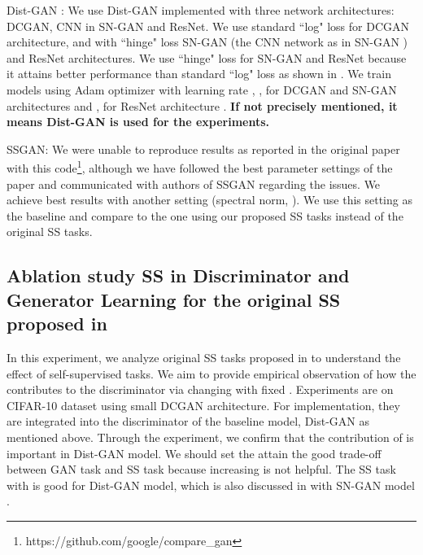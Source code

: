 \documentclass{article}
\begin{document}
Dist-GAN \cite{tran-eccv-2018}: We use Dist-GAN implemented with three network architectures: DCGAN, CNN in SN-GAN and ResNet.
We use standard ``log" loss for DCGAN architecture, and  with ``hinge" loss SN-GAN (the CNN network as in SN-GAN \cite{miyato-iclr-2018}) and ResNet architectures. We use ``hinge" loss for SN-GAN  and ResNet because it attains better performance than standard ``log" loss as shown in \cite{miyato-iclr-2018}. 
We train models using Adam optimizer with learning rate , ,  for DCGAN and SN-GAN architectures and ,  for ResNet architecture \cite{gulrajani-arxiv-2017}. {\bf If not precisely mentioned, it means Dist-GAN is used for the experiments.}

SSGAN: We were unable to reproduce results as reported in the original paper with this code\footnote{https://github.com/google/compare\_gan}, although we have followed the best parameter settings of the paper and communicated with authors of SSGAN regarding the issues. We achieve best results with another setting (spectral norm, ).
We use this setting as the baseline and compare to the one using our proposed SS tasks instead of the original SS tasks.


\subsection{Ablation study SS in Discriminator and Generator Learning for the original SS proposed in 
\cite{chen-arxiv-2018}}



\label{appendix_ablation_discriminator_learning}

In this experiment, we analyze original SS tasks proposed in \cite{chen-arxiv-2018} to understand the effect of self-supervised tasks.
We aim to provide empirical observation of how the  contributes to the discriminator via changing  with fixed . Experiments are on CIFAR-10 dataset using small DCGAN architecture. For implementation, they are integrated into the discriminator of the baseline model, Dist-GAN \cite{tran-eccv-2018} as mentioned above. Through the experiment, we confirm that the contribution of  is important in Dist-GAN model. We should set the  attain the good trade-off between GAN task and SS task because increasing  is not helpful. The SS task with  is good for Dist-GAN model, which is also discussed in \cite{chen-arxiv-2018} with SN-GAN model \cite{miyato-iclr-2018}. 
\end{document}

